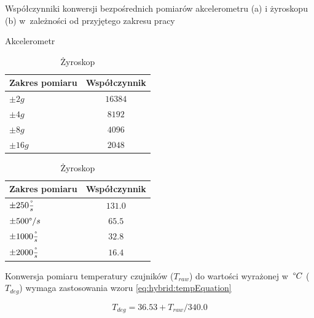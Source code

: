 \begin{savenotes}
	\begin{table}[!htb]
		\caption[Współczynniki konwersji bezpośrednich pomiarów akcelerometru (a) i żyroskopu (b) w~zależności od przyjętego zakresu pracy]{Współczynniki konwersji bezpośrednich pomiarów akcelerometru (a) i żyroskopu (b) w~zależności od przyjętego zakresu pracy}
		\begin{subtable}{.5\linewidth}
			\centering
			\caption{Akcelerometr}
			\label{tab:hybrid:accRangeFactors} 
			\begin{tabular}{|l|c|}
				\hline
				Zakres pomiaru              & Współczynnik \\ \hline
				$\pm2g$                     & $16384$        \\ \hline
				\rowcolor{black!20} $\pm4g$ & $8192$         \\ \hline
				$\pm8g$                     & $4096$         \\ \hline
				$\pm16g$                    & $2048$         \\ \hline
			\end{tabular}
		\end{subtable}%
		\begin{subtable}{.5\linewidth}
			\centering
			\caption{Żyroskop}
			\label{tab:hybrid:gyroRangeFactors}	
			\begin{tabular}{|l|c|}
				\hline
				Zakres pomiaru                        & Współczynnik \\ \hline
				$\pm250\frac{\degree}{s}$             & $131.0$        \\ \hline
				\rowcolor{black!20} $\pm500\degree/s$ & $65.5$         \\ \hline
				$\pm1000\frac{\degree}{s}$            & $32.8$         \\ \hline
				$\pm2000\frac{\degree}{s}$            & $16.4$         \\ \hline
			\end{tabular}
		\end{subtable} 
	\end{table}
\end{savenotes}	
		
		
Konwersja pomiaru temperatury czujników ($T_{raw}$) do wartości wyrażonej w~$\degree C$ ($T_{deg}$) wymaga zastosowania wzoru \ref{eq:hybrid:tempEquation}

\begin{equation}
	T_{deg} = 36.53 + T_{raw} / 340.0
	\label{eq:hybrid:tempEquation}
\end{equation}

